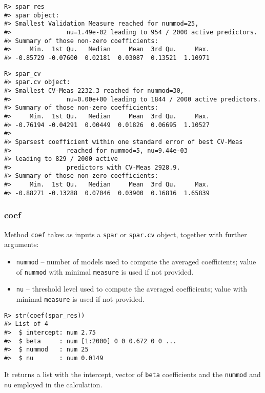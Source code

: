 \documentclass[
  article]{jss}
\begin{document}
\begin{verbatim}
R> spar_res
#> spar object:
#> Smallest Validation Measure reached for nummod=25,
#>               nu=1.49e-02 leading to 954 / 2000 active predictors.
#> Summary of those non-zero coefficients:
#>     Min.  1st Qu.   Median     Mean  3rd Qu.     Max. 
#> -0.85729 -0.07600  0.02181  0.03087  0.13521  1.10971
\end{verbatim}

\begin{verbatim}
R> spar_cv
#> spar.cv object:
#> Smallest CV-Meas 2232.3 reached for nummod=30,
#>               nu=0.00e+00 leading to 1844 / 2000 active predictors.
#> Summary of those non-zero coefficients:
#>     Min.  1st Qu.   Median     Mean  3rd Qu.     Max. 
#> -0.76194 -0.04291  0.00449  0.01826  0.06695  1.10527 
#> 
#> Sparsest coefficient within one standard error of best CV-Meas
#>               reached for nummod=5, nu=9.44e-03 
#> leading to 829 / 2000 active
#>               predictors with CV-Meas 2928.9.
#> Summary of those non-zero coefficients:
#>     Min.  1st Qu.   Median     Mean  3rd Qu.     Max. 
#> -0.88271 -0.13288  0.07046  0.03900  0.16816  1.65839
\end{verbatim}

\subsubsection{coef}\label{coef}

Method \texttt{coef} takes as inputs a \texttt{spar} or \texttt{spar.cv}
object, together with further arguments:

\begin{itemize}
\item
  \texttt{nummod} -- number of models used to compute the averaged
  coefficients; value of \texttt{nummod} with minimal \texttt{measure}
  is used if not provided.
\item
  \texttt{nu} -- threshold level used to compute the averaged
  coefficients; value with minimal \texttt{measure} is used if not
  provided.
\end{itemize}

\begin{verbatim}
R> str(coef(spar_res))
#> List of 4
#>  $ intercept: num 2.75
#>  $ beta     : num [1:2000] 0 0 0.672 0 0 ...
#>  $ nummod   : num 25
#>  $ nu       : num 0.0149
\end{verbatim}

It returns a list with the intercept, vector of \texttt{beta}
coefficients and the \texttt{nummod} and \texttt{nu} employed in the
calculation.
\end{document}
